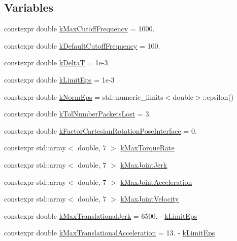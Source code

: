\subsection*{Variables}
\begin{DoxyCompactItemize}
\item 
constexpr double \hyperlink{namespacefranka_adb10b364af8deb9e17d9bcc1ff2695be}{k\+Max\+Cutoff\+Frequency} = 1000.
\item 
constexpr double \hyperlink{namespacefranka_ad8e3b7da346e03181ab5ac138a4171d4}{k\+Default\+Cutoff\+Frequency} = 100.
\item 
constexpr double \hyperlink{namespacefranka_a1e207a0d5a6e90c1e1a78e6e1057120a}{k\+DeltaT} = 1e-\/3
\item 
constexpr double \hyperlink{namespacefranka_aad1f9b575274830b8da9e638559d424b}{k\+Limit\+Eps} = 1e-\/3
\item 
constexpr double \hyperlink{namespacefranka_a420d72830a872ef375d9d6cbb1c439b5}{k\+Norm\+Eps} = std\+::numeric\+\_\+limits$<$double$>$\+::epsilon()
\item 
constexpr double \hyperlink{namespacefranka_a664b546834ceecd4e3220ffa92f1172c}{k\+Tol\+Number\+Packets\+Lost} = 3.
\item 
constexpr double \hyperlink{namespacefranka_a19166d1a64c5a84f80b4ed3aa0bfb3a0}{k\+Factor\+Cartesian\+Rotation\+Pose\+Interface} = 0.
\item 
constexpr std\+::array$<$ double, 7 $>$ \hyperlink{namespacefranka_a6c1a0e9a5e1f375d2aad61edac907d4e}{k\+Max\+Torque\+Rate}
\item 
constexpr std\+::array$<$ double, 7 $>$ \hyperlink{namespacefranka_a600a21a6151ff2eee38294293dd8aeec}{k\+Max\+Joint\+Jerk}
\item 
constexpr std\+::array$<$ double, 7 $>$ \hyperlink{namespacefranka_a826ecf0b7d214df69c1ee416d3e66b93}{k\+Max\+Joint\+Acceleration}
\item 
constexpr std\+::array$<$ double, 7 $>$ \hyperlink{namespacefranka_a6d451800a90b939422dc9c3fb103ca23}{k\+Max\+Joint\+Velocity}
\item 
constexpr double \hyperlink{namespacefranka_a46b8f11959ed3f731a0914f524af8e69}{k\+Max\+Translational\+Jerk} = 6500. -\/ \hyperlink{namespacefranka_aad1f9b575274830b8da9e638559d424b}{k\+Limit\+Eps}
\item 
constexpr double \hyperlink{namespacefranka_a3803b1a54ba526ccaa4fa0d15446f3db}{k\+Max\+Translational\+Acceleration} = 13. -\/ \hyperlink{namespacefranka_aad1f9b575274830b8da9e638559d424b}{k\+Limit\+Eps}

\end{DoxyCompactItemize}
